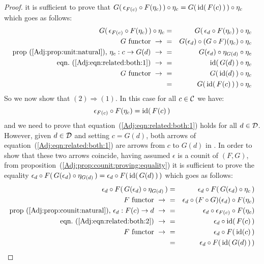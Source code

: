 \begin{proof}
    it is sufficient to prove that $G(\,\epsilon_{F(c)}\circ F(\eta_{c})\,)
    \circ\eta_{c}=G(\,\mbox{\rm id}(\,F(c)\,)\,)\circ\eta_{c}$ which goes as follows:
        \begin{eqnarray*}G(\,\epsilon_{F(c)}\circ F(\eta_{c})\,)\circ\eta_{c}
            &=&G(\,\epsilon_{d}\circ F(\eta_{c})\,)\circ\eta_{c}\\
            \mbox{$G$ functor}\ \to\ 
            &=&G(\epsilon_{d})\circ (G \circ F)(\eta_{c})\circ\eta_{c}\\
            \mbox{prop~(\ref{Adj:prop:unit:natural}), $\eta_{c}:c\to G(d)$}\ \to\ 
            &=&G(\epsilon_{d})\circ \eta_{G(d)}\circ\eta_{c}\\
            \mbox{eqn.~(\ref{Adj:eqn:related:both:1})}\ \to\ 
            &=&\id(\,G(d)\,)\circ\eta_{c}\\
            \mbox{$G$ functor}\ \to\ 
            &=&G(\,\id(d)\,)\circ\eta_{c}\\
            &=&G(\,\id(\,F(c)\,)\,)\circ\eta_{c}
        \end{eqnarray*}
    So we now show that $(2)\Rightarrow(1)$. In this case for all $c\in\mbox{$\cal C$}$
    we have:
        \begin{equation}\label{Adj:eqn:related:both:2}
            \epsilon_{F(c)}\circ F(\eta_{c})=\mbox{\rm id}(\,F(c)\,)
        \end{equation}
    and we need to prove that equation~(\ref{Adj:eqn:related:both:1}) holds
    for all $d\in\mbox{$\cal D$}$. However, given $d\in\mbox{$\cal D$}$ and setting $c=G(d)$, both
    arrows of equation~(\ref{Adj:eqn:related:both:1}) are arrows from $c$ to
    $G(d)$ in \Cat. In order to show that these two arrows coincide, having
    assumed $\epsilon$ is a counit of $(F,G)$, from
    proposition~(\ref{Adj:prop:counit:proving:equality}) it is sufficient to
    prove the equality $\epsilon_{d}\circ F(\,G(\epsilon_{d})\circ\eta_{G(d)}\,)=
    \epsilon_{d}\circ F(\,\mbox{\rm id}(\,G(d)\,)\,)$ which goes as follows:
        \begin{eqnarray*}\epsilon_{d}\circ F(\,G(\epsilon_{d})\circ\eta_{G(d)}\,)
            &=&\epsilon_{d}\circ F(\,G(\epsilon_{d})\circ\eta_{c}\,)\\
            \mbox{$F$ functor}\ \to\ 
            &=&\epsilon_{d}\circ (F\circ G)(\epsilon_{d})\circ F(\eta_{c})\\
            \mbox{prop~(\ref{Adj:prop:counit:natural}), $\epsilon_{d}:F(c)\to d$}
            \ \to\ 
            &=&\epsilon_{d}\circ\epsilon_{F(c)}\circ F(\eta_{c})\\
            \mbox{eqn.~(\ref{Adj:eqn:related:both:2})}\ \to\ 
            &=&\epsilon_{d}\circ\id(\,F(c)\,)\\
            \mbox{$F$ functor}\ \to\ 
            &=&\epsilon_{d}\circ F(\,\id(c)\,)\\
            &=&\epsilon_{d}\circ F(\,\id(\,G(d)\,)\,)\\
        \end{eqnarray*}
\end{proof}


